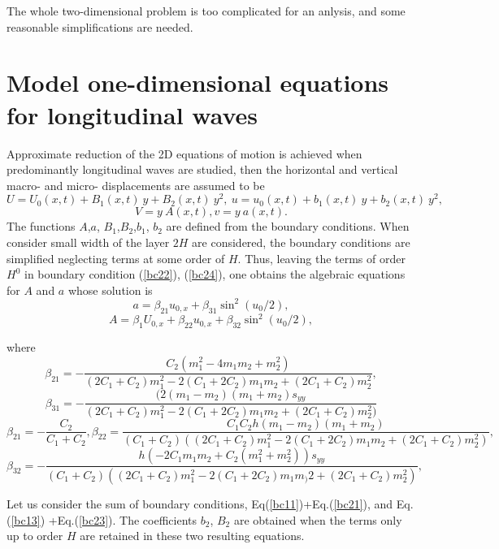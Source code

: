 The whole two-dimensional problem is too complicated for an anlysis, and some reasonable simplifications are needed.

\section{Model one-dimensional equations for longitudinal waves}

Approximate reduction of the 2D equations of motion is achieved when predominantly longitudinal waves are studied, then the horizontal and vertical macro- and micro- displacements are assumed to be 
\begin{equation}
	U=U_0(x,t)+B_1(x,t)~y+B_2(x,t)~y^2,~u=u_0(x,t)+b_1(x,t)~y+b_2(x,t)~y^2, \label{Usol}
\end{equation}
\begin{equation}
	V=y ~A(x,t), v=y~a(x,t). \label{Vsol}
\end{equation}
The functions $A$,$a$, $B_1$,$B_2$,$b_1$, $b_2$ are defined from the boundary conditions. When consider small width of the layer $2H$  are considered,  the boundary conditions are simplified neglecting terms at some order of $H$.  Thus, leaving  the  terms of order $H^0$ in boundary condition (\ref{bc22}), (\ref{bc24}), one obtains  the algebraic equations  for $A$ and $a$ whose solution is
\[
a=\beta_{21} u_{0,x}+\beta_{31} \sin^2(u_0/2),
\]
\[
A=\beta_{1} U_{0,x}+\beta_{22} u_{0,x}+\beta_{32}\sin^2(u_0/2),
\]

where
\[ 
\beta_{21}=-\frac{C_2 (m_1^2 - 4 m_1 m_2 + m_2^2)}{(2 C_1 + C_2) m_1^2 - 
	2 (C_1 + 2 C_2) m_1 m_2 + (2 C_1 + C_2) m_2^2},
\]
\[
\beta_{31}=-\frac{(2 (m_1 - m_2) (m_1 + m_2) s_{yy}}{(2 C_1 + C_2) m_1^2 - 
	2 (C_1 + 2 C_2) m_1 m_2 + (2 C_1 + C_2) m_2^2)}
\]
\[
\beta_{21}=-\frac{C_2}{C_1+C_2}, 
\beta_{22}=\frac{C_1 C_2 h (m_1 - m_2) (m_1 + m_2)}{(C_1 + C_2) ((2 C_1 + C_2) m_1^2 - 
	2 (C_1 + 2 C_2) m_1 m_2 + (2 C_1 + C_2) m_2^2)}, 
\]
\[
\beta_{32}=-\frac{h (-2 C_1 m_1 m_2 + C_2 (m_1^2 + m_2^2)) s_{yy}}{(C_1 + 
	C_2) ((2 C_1 + C_2) m_1^2 - 2 (C_1 + 2 C_2) m_1 m_)2 + (2 C_1 + C_2) m_2^2)},
\]

Let us consider the sum of boundary conditions, Eq(\ref{bc11})+Eq.(\ref{bc21}), and Eq.(\ref{bc13}) +Eq.(\ref{bc23}).  The coefficients $b_2$, $B_2$ are obtained when the terms only up to order $H$ are retained in these two resulting equations. 


